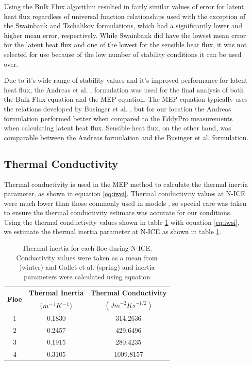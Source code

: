 Using the Bulk Flux algorithm resulted in fairly similar values of error for latent heat flux regardless of universal function relationships used with the exception of the Swainbank and Tschalikov \cite{foken:2008} formulations, which had a significantly lower and higher mean error, respectively. While Swainbank \cite{foken:2008} did have the lowest mean error for the latent heat flux and one of the lowest for the sensible heat flux, it was not selected for use because of the low number of stability conditions it can be used over.  

Due to it's wide range of stability values and it's improved performance for latent heat flux, the Andreas et al. \cite{andreas:2010}, formulation was used for the final analysis of both the Bulk Flux equation and the MEP equation. The MEP equation typically uses the relations developed by Businger et al. \cite{businger:1971}, but for our location the Andreas \cite{andreas:311} formulation performed better when compared to the EddyPro measurements when calculating latent heat flux. Sensible heat flux, on the other hand, was comparable between the Andreas \cite{andreas:311} formulation and the Businger et al. \cite{businger:1971} formulation. 


\subsection{Thermal Conductivity}
Thermal conductivity is used in the MEP method to calculate the thermal inertia parameter, as shown in equation \ref{eq:iwsi}. Thermal conductivity values at N-ICE were much lower than those commonly used in models \cite{merkouriadi:2017}, so special care was taken to ensure the thermal conductivity estimate was accurate for our conditions. Using the thermal conductivity values shown in table \ref{tab:thermal} with equation \ref{eq:iwsi}, we estimate the thermal inertia parameter at N-ICE as shown in table \ref{tab:thermal}. 

\begin{table}[H]
\centering
{
\begin{tabular}{| c | c | c |}
 \hline
\multirow{2}{*}{\textbf{Floe}} & \textbf{Thermal Inertia} & \textbf{Thermal Conductivity} \\
  & $(m^{-1} \space K^{-1})$ & $(J m^{-2}Ks^{-1/2})$ \\
  \hline
 1 & 0.1830 & 314.2636  \\
 2 & 0.2457 & 429.6496 \\ 
 3 & 0.1915 & 280.4235 \\
 4 & 0.3105 & 1009.8157 \\
  \hline
\end{tabular}}
\caption{Thermal inertia for each floe during N-ICE. Conductivity values were taken as a mean from \cite{merkouriadi:2017} (winter) and Gallet et al. \cite{gallet:2017} (spring) and inertia parameters were calculated using equation}
\label{tab:thermal}
\end{table}

